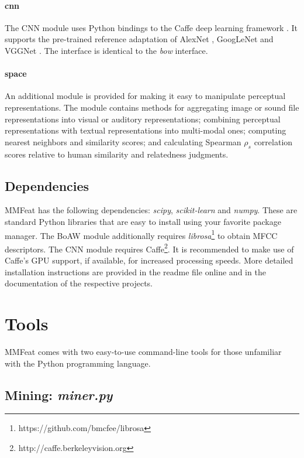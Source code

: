 \documentclass[11pt]{article}
\begin{document}
\paragraph{cnn} The CNN module uses Python bindings to the Caffe deep learning framework \cite{Jia:2014mm}. It supports the pre-trained reference adaptation of AlexNet \cite{Krizhevsky:2012nips}, GoogLeNet \cite{Szegedy:2015cvpr} and VGGNet \cite{Simonyan:2015iclr}. The interface is identical to the \emph{bow} interface.

\paragraph{space} An additional module is provided for making it easy to manipulate perceptual representations. The module contains methods for aggregating image or sound file representations into visual or auditory representations; combining perceptual representations with textual representations into multi-modal ones; computing nearest neighbors and similarity scores; and calculating Spearman $\rho_s$ correlation scores relative to human similarity and relatedness judgments.

\subsection{Dependencies}

MMFeat has the following dependencies: \emph{scipy}, \emph{scikit-learn} and \emph{numpy}. These are standard Python libraries that are easy to install using your favorite package manager. The BoAW module additionally requires \emph{librosa}\footnote{https://github.com/bmcfee/librosa} to obtain MFCC descriptors. The CNN module requires Caffe\footnote{http://caffe.berkeleyvision.org}. It is recommended to make use of Caffe's GPU support, if available, for increased processing speeds. More detailed installation instructions are provided in the readme file online and in the documentation of the respective projects.

\section{Tools}

MMFeat comes with two easy-to-use command-line tools for those unfamiliar with the Python programming language.

\subsection{Mining: \emph{miner.py}}
\end{document}
